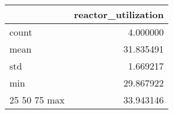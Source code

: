 \begin{tabular}{lr}
\toprule
 & reactor\_utilization \\
\midrule
count & 4.000000 \\
mean & 31.835491 \\
std & 1.669217 \\
min & 29.867922 \\
25%
50%
75%
max & 33.943146 \\
\bottomrule
\end{tabular}

